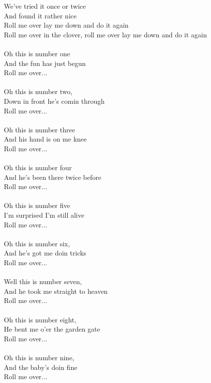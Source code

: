 \vspace{10pt}
We've tried it once or twice\\
And found it rather nice\\
Roll me over lay me down and do it again\\
Roll me over in the clover, roll me over lay me down and do it again\\
\\
Oh this is number one \\
And the fun has just begun\\
Roll me over...\\
\\
Oh this is number two,\\
Down in front he's comin through\\
Roll me over...\\
\\
Oh this is number three\\
And his hand is on me knee\\
Roll me over...\\
\\
Oh this is number four\\
And he's been there twice before\\
Roll me over...\\
\\
Oh this is number five\\
I'm surprised I'm still alive\\
Roll me over...\\
\\
Oh this is number six,\\
And he's got me doin tricks\\
Roll me over...\\
\\
Well this is number seven,\\
And he took me straight to heaven\\
Roll me over...\\
\\
Oh this is number eight,\\
He bent me o'er the garden gate\\
Roll me over...\\
\\
Oh this is number nine,\\
And the baby's doin fine\\
Roll me over...\\
\\
